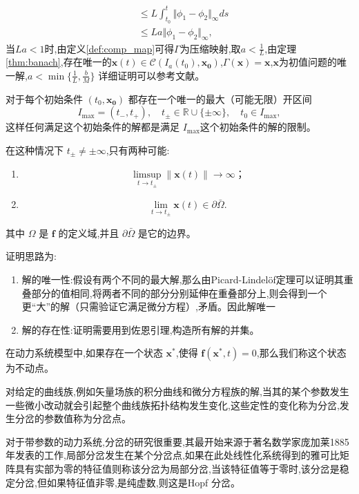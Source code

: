 \begin{pf}
\begin{equation}
\begin{aligned}
                                                             & \leq L\int_{t_0}^t\Vert \phi_1-\phi_2\Vert_{\infty} ds                             \\
                                                             & \leq La\Vert \phi_1-\phi_2\Vert_{\infty},
        \end{aligned}
    \end{equation}
    当$La<1$时,由定义\ref{def:comp_map}可得$\Gamma$为压缩映射,取$a<\frac{1}{L}$,由定理\ref{thm:banach},存在唯一的$\mathbf{x}(t)\in \mathcal{C}(I_a(t_0),\mathbf{x_0})$,$\Gamma(\mathbf{x})=\mathbf{x}$,$\mathbf{x}$为初值问题的唯一解,$a<\min\{\frac{1}{L},\frac{b}{M}\}$
    详细证明可以参考文献\cite{murray2013existence}。
\end{pf}
\begin{rem}\label{rem:P-L}
    对于每个初始条件 $(t_0, \mathbf{x_0})$ 都存在一个唯一的最大（可能无限）开区间
    $$I_{\text{max}} = (t_{-}, t_{+}), \quad t_{\pm} \in \mathbb{R} \cup \{\pm \infty\}, \quad t_0 \in I_{\text{max}},$$
    这样任何满足这个初始条件的解都是满足 $I_{\text{max}}$这个初始条件的解的限制。

    在这种情况下 $t_{\pm} \neq \pm \infty$,只有两种可能:
    \begin{enumerate}
        \item $$\limsup_{t \to t_{\pm}} \|\mathbf{x}(t)\| \to \infty；$$
        \item $$\lim_{t \to t_{\pm}} \mathbf{x}(t) \in \partial \bar{\Omega}.$$
    \end{enumerate}
    其中 $\Omega$ 是 $\mathbf{f}$ 的定义域,并且 $\partial \bar{\Omega}$ 是它的边界。
\end{rem}
\begin{pf}
    证明思路为:
    \begin{enumerate}
        \item 解的唯一性:假设有两个不同的最大解,那么由Picard-Lindelöf定理可以证明其重叠部分的值相同,将两者不同的部分分别延伸在重叠部分上,则会得到一个更“大”的解（只需验证它满足微分方程）,矛盾。因此解唯一
        \item 解的存在性:证明需要用到佐恩引理,构造所有解的并集。
    \end{enumerate}
\end{pf}

\begin{defn}[不动点]
    在动力系统模型中,如果存在一个状态 $\mathbf{x}^*$,使得 $\mathbf{f}(\mathbf{x}^*, t) = 0$,那么我们称这个状态为不动点。
\end{defn}
\begin{defn}[分岔]
    对给定的曲线族,例如矢量场族的积分曲线和微分方程族的解,当其的某个参数发生一些微小改动就会引起整个曲线族拓扑结构发生变化,这些定性的变化称为分岔,发生分岔的参数值称为分岔点。
\end{defn}
对于带参数的动力系统,分岔的研究很重要,其最开始来源于著名数学家庞加莱1885年发表的工作,局部分岔发生在某个分岔点,如果在此处线性化系统得到的雅可比矩阵具有实部为零的特征值则称该分岔为局部分岔,当该特征值等于零时,该分岔是稳定分岔,但如果特征值非零,是纯虚数,则这是Hopf 分岔\cite{enwiki:1216903952}。


